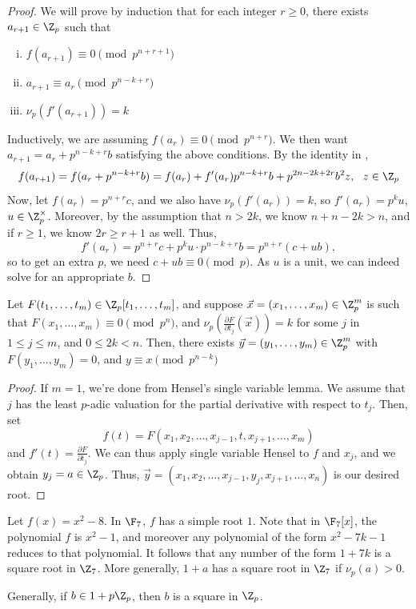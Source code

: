 \begin{proof}
    We will prove by induction that for each integer $r \geq 0$, there exists $a_{r+1} \in \Z_p$ such that
    \begin{enumerate}[(i)]
        \item $f(a_{r+1}) \equiv 0 \pmod {p^{n+r+1}}$
        \item $a_{r+1} \equiv a_r \pmod{p^{n-k+r}}$
        \item $\nu_p(f'(a_{r+1}))=k$
    \end{enumerate}
    Inductively, we are assuming $f(a_r) \equiv 0 \pmod{p^{n+r}}$. We then want $a_{r+1}=a_r+p^{n-k+r}b$ satisfying the above conditions. By the identity in ,
    $$f(a_{r+1})= f(a_r+p^{n-k+r}b)=f(a_r)+f'(a_r)p^{n-k+r}b +p^{2n-2k+2r}b^2z,\:\:\:z \in \Z_p$$
    Now, let $f(a_r)=p^{n+r}c$, and we also have $\nu_p(f'(a_r))=k$, so $f'(a_r)=p^ku$, $u \in \Z_p^\times$. Moreover, by the assumption that $n>2k$, we know $n+n-2k>n$, and if $r \geq 1$, we know $2r \geq r+1$ as well. Thus,
    $$f'(a_r)=p^{n+r}c+p^ku\cdot p^{n-k+r}b=p^{n+r}(c+ub),$$
    so to get an extra $p$, we need $c+ub \equiv 0 \pmod p$. As $u$ is a unit, we can indeed solve for an appropriate $b$.
\end{proof}

\begin{thm}
    Let $F(t_1,\dots,t_m) \in \Z_p[t_1,\dots,t_m]$, and suppose $\vec x = (x_1,\dots,x_m) \in \Z_p^m$ is such that $F(x_1,\dots,x_m) \equiv 0 \pmod{p^n}$, and $\nu_p(\frac{\partial F}{\partial t_j}(\vec x))=k$ for some $j$ in $1 \leq j \leq m$, and $0 \leq 2k < n$. Then, there exists $\vec y =(y_1,\dots,y_m) \in \Z_p^m$ with $F(y_1,\dots,y_m) = 0$, and $y \equiv x \pmod{p^{n-k}}$
\end{thm}

\begin{proof}
    If $m=1$, we're done from Hensel's single variable lemma. We assume that $j$ has the least $p$-adic valuation for the partial derivative with respect to $t_j$. Then, set
    $$f(t)= F(x_1,x_2,\dots ,x_{j-1},t,x_{j+1},\dots,x_m)$$
    and $f'(t) = \frac{\partial F}{\partial t_j}$. We can thus apply single variable Hensel to $f$ and $x_j$, and we obtain $y_j = a \in \Z_p$. Thus, $\vec y=(x_1,x_2,\dots,x_{j-1},y_j,x_{j+1},\dots,x_n)$ is our desired root.
\end{proof}

\begin{ex}
    Let $f(x) = x^2-8$. In $\F_7$, $f$ has a simple root $1$. Note that in $\F_7[x]$, the polynomial $f$ is $x^2-1$, and moreover any polynomial of the form $x^2-7k-1$ reduces to that polynomial. It follows that any number of the form $1+7k$ is a square root in $\Z_7$. More generally, $1+a$ has a square root in $\Z_7$ if $\nu _p(a)>0$.

    Generally, if $b \in 1+p\Z_p$, then $b$ is a square in $\Z_p$.
\end{ex}


